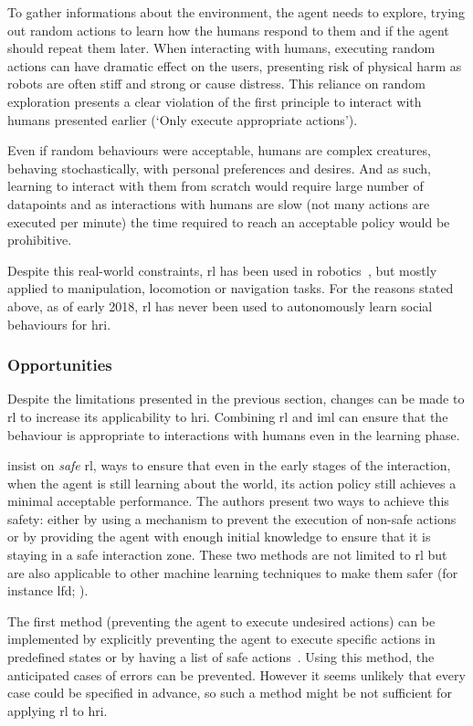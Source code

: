 	To gather informations about the environment, the agent needs to explore, trying out random actions to learn how the humans respond to them and if the agent should repeat them later. When interacting with humans, executing random actions can have dramatic effect on the users, presenting risk of physical harm as robots are often stiff and strong or cause distress. This reliance on random exploration presents a clear violation of the first principle to interact with humans presented earlier (`Only execute appropriate actions').
	
	Even if random behaviours were acceptable, humans are complex creatures, behaving stochastically, with personal preferences and desires. And as such, learning to interact with them from scratch would require large number of datapoints and as interactions with humans are slow (not many actions are executed per minute) the time required to reach an acceptable policy would be prohibitive. 
	
	Despite this real-world constraints, \gls{rl} has been used in robotics~\citep{kober2013reinforcement}, but mostly applied to manipulation, locomotion or navigation tasks. For the reasons stated above, as of early 2018, \gls{rl} has never been used to autonomously learn social behaviours for \gls{hri}. 
	
	\subsubsection{Opportunities}  
	Despite the limitations presented in the previous section, changes can be made to \gls{rl} to increase its applicability to \gls{hri}. Combining \gls{rl} and \gls{iml} can ensure that the behaviour is appropriate to interactions with humans even in the learning phase.
	
	\cite{garcia2015comprehensive} insist on \textit{safe} \gls{rl}, ways to ensure that even in the early stages of the interaction, when the agent is still learning about the world, its action policy still achieves a minimal acceptable performance. The authors present two ways to achieve this safety: either by using a mechanism to prevent the execution of non-safe actions or by providing the agent with enough initial knowledge to ensure that it is staying in a safe interaction zone. These two methods are not limited to \gls{rl} but are also applicable to other machine learning techniques to make them safer (for instance \gls{lfd}; \citealt{billard2008robot}). 
	
	The first method (preventing the agent to execute undesired actions) can be implemented by explicitly preventing the agent to execute specific actions in predefined states or by having a list of safe actions~\citep{alshiekh2017safe}. Using this method, the anticipated cases of errors can be prevented. However it seems unlikely that every case could be specified in advance, so such a method might be not sufficient for applying \gls{rl} to \gls{hri}. %
	
